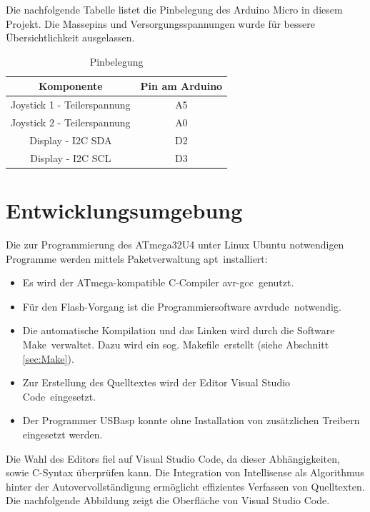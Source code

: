 Die nachfolgende Tabelle listet die Pinbelegung des Arduino Micro in diesem Projekt. Die Massepins und Versorgungsspannungen wurde für bessere Übersichtlichkeit ausgelassen.

\begin{table}[H]
\begin{center}
\caption{Pinbelegung}
\begin{tabular}{|c|c|}
\hline 
Komponente & Pin am Arduino \\ 
\hline
\hline 
Joystick 1 - Teilerspannung & A5 \\ 
\hline 
Joystick 2 - Teilerspannung & A0 \\ 
\hline 
Display - I2C SDA & D2 \\ 
\hline 
Display - I2C SCL & D3 \\ 
\hline 
\end{tabular}
\end{center}
\end{table}

\section{Entwicklungsumgebung}
\label{sec:IDE}
Die zur Programmierung des ATmega32U4 unter Linux Ubuntu notwendigen Programme werden mittels Paketverwaltung \glqq apt\grqq\ installiert:
\begin{itemize}
\setlength\itemsep{-0.5em}
\item Es wird der ATmega-kompatible C-Compiler \glqq avr-gcc\grqq\ genutzt.
\item Für den Flash-Vorgang ist die Programmiersoftware \glqq avrdude\grqq\ notwendig.
\item Die automatische Kompilation und das Linken wird durch die Software \glqq Make\grqq\ verwaltet. Dazu wird ein sog. \glqq Makefile\grqq\ erstellt (siehe Abschnitt \ref{sec:Make}).
\item Zur Erstellung des Quelltextes wird der Editor \glqq Visual Studio Code\grqq\ eingesetzt.
\item Der Programmer USBasp konnte ohne Installation von zusätzlichen Treibern eingesetzt werden.
\end{itemize}
\noindent Die Wahl des Editors fiel auf Visual Studio Code, da dieser Abhängigkeiten, sowie C-Syntax überprüfen kann. Die Integration von Intellisense als Algorithmus hinter der Autovervollständigung ermöglicht effizientes Verfassen von Quelltexten. Die nachfolgende Abbildung zeigt die Oberfläche von Visual Studio Code.


